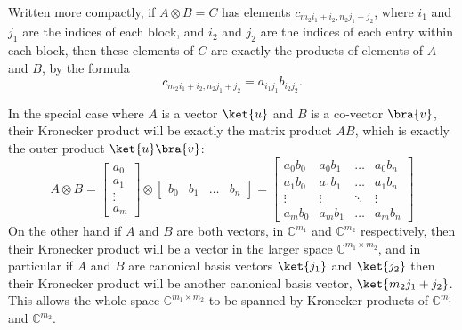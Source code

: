 Written more compactly, if $A\otimes B = C$ has elements $c_{m_2i_1 + i_2,n_2j_1+j_2}$, where $i_1$ and $j_1$ are the indices of each block, and $i_2$ and $j_2$ are the indices of each entry within each block, then these elements of $C$ are exactly the products of elements of $A$ and $B$, by the formula
\[c_{m_2i_1 + i_2,n_2j_1+j_2} = a_{i_1j_1}b_{i_2j_2}.\]

In the special case where $A$ is a vector $\ket{u}$ and $B$ is a co-vector $\bra{v}$, their Kronecker product will be exactly the matrix product $AB$, which is exactly the outer product $\ket{u}\bra{v}$:
\[
A \otimes B =
\left[\begin{matrix}
	a_0\\a_1\\\vdots\\a_m
\end{matrix}\right]
\otimes
\left[\begin{matrix}
	b_0&b_1&\dots&b_n
\end{matrix}\right]
=
\left[\begin{matrix}
	a_0b_0 & a_0b_1 & \dots & a_0b_n\\
	a_1b_0 & a_1b_1 & \dots & a_1b_n\\
	\vdots & \vdots & \ddots & \vdots\\
	a_mb_0 & a_mb_1 & \dots & a_mb_n
\end{matrix}\right]
\]
On the other hand if $A$ and $B$ are both vectors, in $\mathbb{C}^{m_1}$ and $\mathbb{C}^{m_2}$ respectively, then their Kronecker product will be a vector in the larger space $\mathbb{C}^{m_1\times m_2}$, and in particular if $A$ and $B$ are canonical basis vectors $\ket{j_1}$ and $\ket{j_2}$ then their Kronecker product will be another canonical basis vector, $\ket{m_2j_1 + j_2}$. This allows the whole space $\mathbb{C}^{m_1 \times m_2}$ to be spanned by Kronecker products of $\mathbb{C}^{m_1}$ and $\mathbb{C}^{m_2}$.

